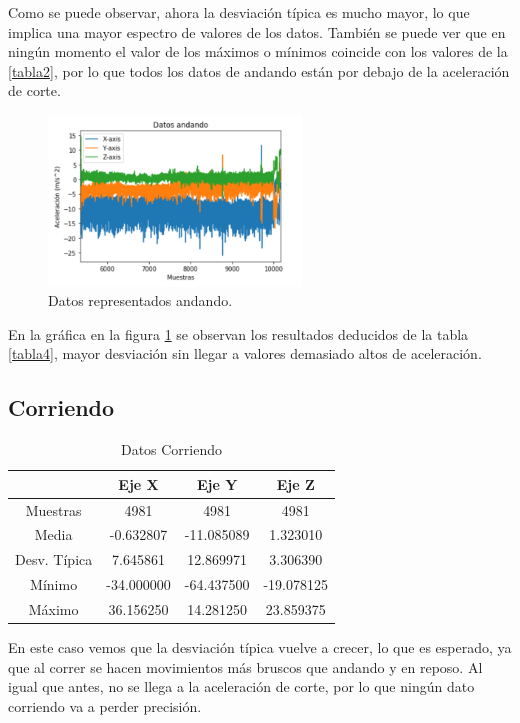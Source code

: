 \documentclass[12pt]{book}
\numberwithin{equation}{section}
\begin{document}
Como se puede observar, ahora la desviación típica es mucho mayor, lo que implica una mayor espectro de valores de los datos. También se puede ver que en ningún momento el valor de los máximos o mínimos coincide con los valores de la \ref{tabla2}, por lo que todos los datos de andando están por debajo de la aceleración de corte.

\begin{figure}[h]
    \centering
    \includegraphics[width=0.6\textwidth]{andandodatos.png}
    \caption{Datos representados andando.}
    \label{fig:andandodatos}
\end{figure}

En la gráfica en la figura \ref{tabla5} se observan los resultados deducidos de la tabla \ref{tabla4}, mayor desviación sin llegar a valores demasiado altos de aceleración.

\newpage
\subsection{Corriendo}

\begin{table}
\centering
\caption{Datos Corriendo}
\begin{tabular}{| c | c | c | c |}
\hline
 & Eje X & Eje Y & Eje Z \\
\hline
Muestras & 4981 & 4981 & 4981 \\
\hline
Media & -0.632807 & -11.085089 & 1.323010 \\
\hline
Desv. Típica & 7.645861 & 12.869971 & 3.306390 \\
\hline
Mínimo & -34.000000 & -64.437500 & -19.078125 \\
\hline
Máximo & 36.156250 & 14.281250 & 23.859375 \\
\hline
\end{tabular}
\label{tabla5}
\end{table}

En este caso vemos que la desviación típica vuelve a crecer, lo que es esperado, ya que al correr se hacen movimientos más bruscos que andando y en reposo. Al igual que antes, no se llega a la aceleración de corte, por lo que ningún dato corriendo va a perder precisión.
\end{document}
